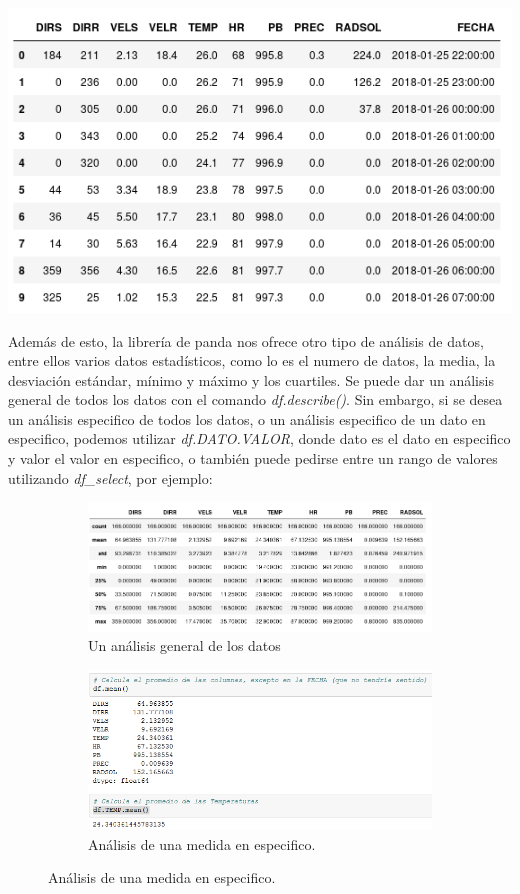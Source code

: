 \documentclass[12pt]{article}
\begin{document}
\begin{center}
\includegraphics[scale=0.7]{NuevaTabla.png}
\end{center}
Además de esto, la librería de panda nos ofrece otro tipo de análisis de datos, entre ellos varios datos estadísticos, como lo es el numero de datos, la media, la desviación estándar, mínimo y máximo y los cuartiles. Se puede dar un análisis general de todos los datos con el comando \textit{df.describe()}. Sin embargo, si se desea un análisis especifico de todos los datos, o un análisis especifico de un dato en especifico, podemos utilizar \textit{df.DATO.VALOR}, donde dato es el dato en especifico y valor el valor en especifico, o también puede pedirse entre un rango de valores utilizando \textit{df\_select}, por ejemplo: \\
\begin{figure}[h!]
\begin{subfigure}{.5\textwidth}
  \centering
  \includegraphics[width=.8\linewidth]{Estad1.png}
  \caption{Un análisis general de los datos}
  \label{fig:sfig1}
\end{subfigure}%
\begin{subfigure}{.6\textwidth}
  \centering
  \includegraphics[width=.8\linewidth]{Estad2.png}
  \caption{Análisis de una medida en especifico.}
  \label{fig:sfig2}
\end{subfigure}
\end{figure}
\end{document}
